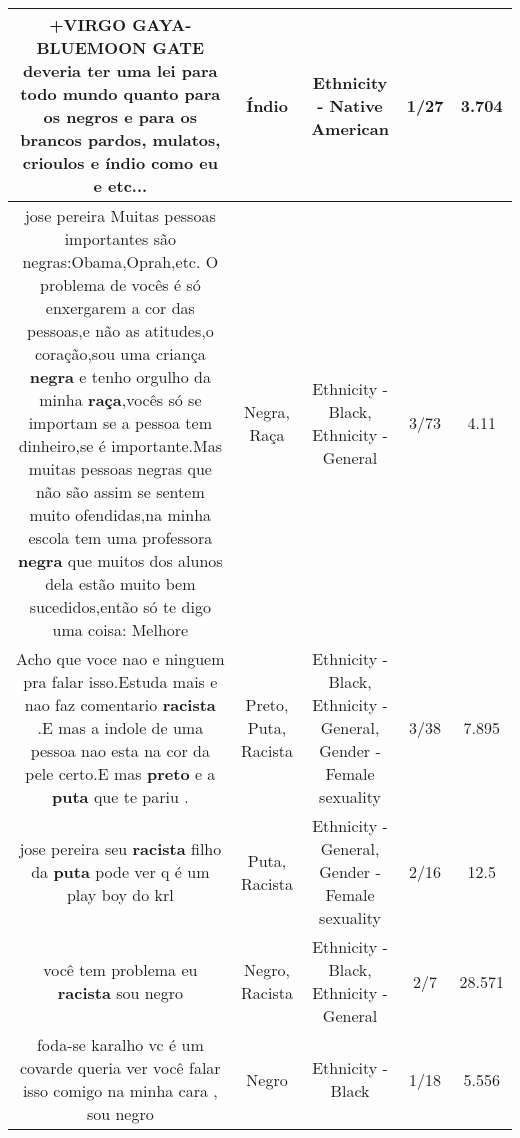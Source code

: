 \documentclass[11pt]{article}
\newlength\mylength
\begin{document}
\begin{center}
\begin{longtable}{|C{.65\mylength}|C{.30\mylength}|C{.12\mylength}|C{.12\mylength}|C{.12\mylength}|}
  \small +VIRGO GAYA-BLUEMOON GATE deveria ter uma lei para todo mundo quanto para os negros e para os brancos pardos, mulatos, crioulos e \textbf{índio} como eu e etc...\normalsize   & Índio & Ethnicity - Native American & 1/27 & 3.704 \\  \hline
  \small jose pereira Muitas pessoas importantes são negras:Obama,Oprah,etc. O problema de vocês é só enxergarem a cor das pessoas,e não as atitudes,o coração,sou uma criança \textbf{negra} e tenho orgulho da minha \textbf{raça},vocês só se importam se a pessoa tem dinheiro,se é importante.Mas muitas pessoas negras que não são assim se sentem muito ofendidas,na minha escola tem uma professora \textbf{negra} que muitos dos alunos dela estão muito bem sucedidos,então só te digo uma coisa: Melhore\normalsize   & Negra, Raça & Ethnicity - Black, Ethnicity - General & 3/73 & 4.11 \\  \hline
  \small Acho que voce nao e ninguem pra falar isso.Estuda mais e nao faz comentario \textbf{racista} .E mas a indole de uma pessoa nao esta na cor da pele certo.E mas \textbf{preto} e a \textbf{puta} que te pariu .\normalsize   & Preto, Puta, Racista & Ethnicity - Black, Ethnicity - General, Gender - Female sexuality & 3/38 & 7.895 \\  \hline
  \small jose pereira  seu \textbf{racista} filho da \textbf{puta} pode ver q é um play boy do krl\normalsize   & Puta, Racista & Ethnicity - General, Gender - Female sexuality & 2/16 & 12.5 \\  \hline
  \small você tem problema eu \textbf{racista} sou negro\normalsize   & Negro, Racista & Ethnicity - Black, Ethnicity - General & 2/7 & 28.571 \\  \hline
  \small foda-se karalho vc é um covarde queria ver você falar isso comigo na minha cara , sou negro\normalsize   & Negro & Ethnicity - Black & 1/18 & 5.556 \\  \hline

\end{longtable}
\end{center}
\end{document}
